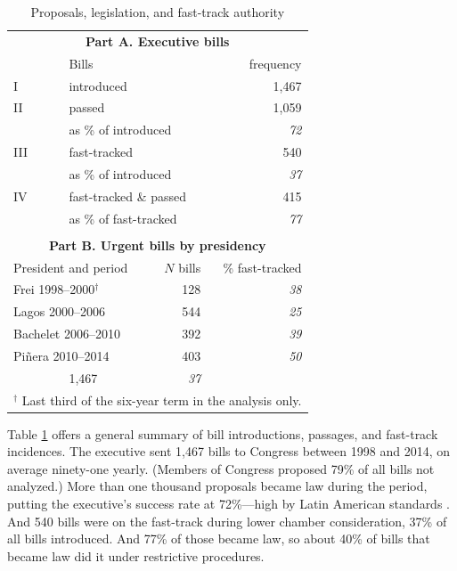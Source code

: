 \documentclass[letter,12pt]{article}
\begin{document}
\begin{table}
\centering
\caption{Proposals, legislation, and fast-track authority}\label{T:billDescriptives}
\begin{tabular}{llrr}
\multicolumn{4}{c}{\textbf{Part A. Executive bills}} \\
   & \multicolumn{2}{l}{Bills}                           &   frequency  \\ \hline
I  & \multicolumn{2}{l}{introduced}                      &       1,467  \\ \hdashline
II & \multicolumn{2}{l}{passed}                          &       1,059  \\
   & \multicolumn{2}{l}{as \% of introduced}             &   \emph{72}  \\ \hdashline
III& \multicolumn{2}{l}{fast-tracked}                    &         540  \\
   & \multicolumn{2}{l}{as \% of introduced}             &   \emph{37}  \\ \hdashline
IV & \multicolumn{2}{l}{fast-tracked \& passed}          &         415  \\
   & \multicolumn{2}{l}{as \% of fast-tracked}           &   \emph{77}  \\ \hline
\\
\multicolumn{4}{c}{\textbf{Part B. Urgent bills by presidency}} \\
\multicolumn{2}{l}{President and period}    & $N$ bills & \% fast-tracked \\ \hline
\multicolumn{2}{l}{Frei 1998--2000$^\dagger$} & 128       &  \emph{38} \\
\multicolumn{2}{l}{Lagos 2000--2006}        & 544       &  \emph{25} \\
\multicolumn{2}{l}{Bachelet 2006--2010}     & 392       &  \emph{39} \\
\multicolumn{2}{l}{Piñera 2010--2014}       & 403       &  \emph{50} \\ \hdashline
\multicolumn{2}{l}{All 1998--2014}          & 1,467     &  \emph{37} \\
\hline
\multicolumn{4}{r}{\footnotesize{$^\dagger$ Last third of the six-year term in the analysis only.}} \\
\end{tabular}
\end{table}

Table \ref{T:billDescriptives} offers a general summary of bill introductions, passages, and fast-track incidences. The executive sent 1,467 bills to Congress between 1998 and 2014, on average ninety-one yearly. (Members of Congress proposed 79\% of all bills not analyzed.) More than one thousand proposals became law during the period, putting the executive's success rate at 72\%---high by Latin American standards \citep{morgenstern.nacif.2002}. And 540 bills were on the fast-track during lower chamber consideration, 37\% of all bills introduced. And 77\% of those became law, so about 40\% of bills that became law did it under restrictive procedures. 
\end{document}
